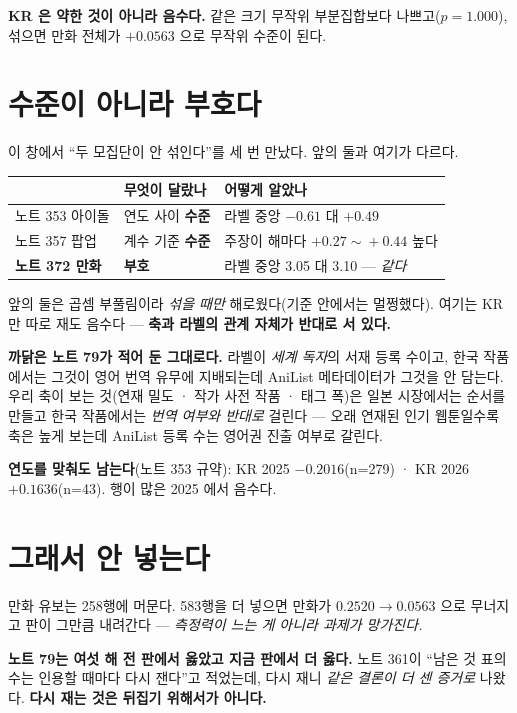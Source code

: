 \documentclass[11pt]{article}
\begin{document}
\textbf{KR 은 약한 것이 아니라 음수다.} 같은 크기 무작위 부분집합보다
나쁘고($p=1.000$), 섞으면 만화 전체가 $+0.0563$ 으로 무작위 수준이 된다.

\section{수준이 아니라 부호다}

이 창에서 ``두 모집단이 안 섞인다''를 세 번 만났다. 앞의 둘과 여기가
다르다.

\begin{center}
\begin{tabular}{lll}
\hline
 & 무엇이 달랐나 & 어떻게 알았나 \\
\hline
노트 353 아이돌 & 연도 사이 \textbf{수준} & 라벨 중앙 $-0.61$ 대 $+0.49$ \\
노트 357 팝업 & 계수 기준 \textbf{수준} & 주장이 해마다 $+0.27\!\sim\!+0.44$ 높다 \\
\textbf{노트 372 만화} & \textbf{부호} & 라벨 중앙 3.05 대 3.10 --- \emph{같다} \\
\hline
\end{tabular}
\end{center}

앞의 둘은 곱셈 부풀림이라 \emph{섞을 때만} 해로웠다(기준 안에서는
멀쩡했다). 여기는 KR 만 따로 재도 음수다 --- \textbf{축과 라벨의 관계
자체가 반대로 서 있다.}

\textbf{까닭은 노트 79가 적어 둔 그대로다.} 라벨이 \emph{세계 독자}의
서재 등록 수이고, 한국 작품에서는 그것이 영어 번역 유무에 지배되는데
AniList 메타데이터가 그것을 안 담는다. 우리 축이 보는 것(연재 밀도 ·
작가 사전 작품 · 태그 폭)은 일본 시장에서는 순서를 만들고 한국 작품에서는
\emph{번역 여부와 반대로} 걸린다 --- 오래 연재된 인기 웹툰일수록 축은
높게 보는데 AniList 등록 수는 영어권 진출 여부로 갈린다.

\textbf{연도를 맞춰도 남는다}(노트 353 규약): KR 2025 $-0.2016$(n=279) ·
KR 2026 $+0.1636$(n=43). 행이 많은 2025 에서 음수다.

\section{그래서 안 넣는다}

만화 유보는 258행에 머문다. 583행을 더 넣으면 만화가 $0.2520 \to 0.0563$
으로 무너지고 판이 그만큼 내려간다 --- \emph{측정력이 느는 게 아니라
과제가 망가진다.}

\textbf{노트 79는 여섯 해 전 판에서 옳았고 지금 판에서 더 옳다.} 노트
361이 ``남은 것 표의 수는 인용할 때마다 다시 잰다''고 적었는데, 다시 재니
\emph{같은 결론이 더 센 증거로} 나왔다. \textbf{다시 재는 것은 뒤집기
위해서가 아니다.}
\end{document}
